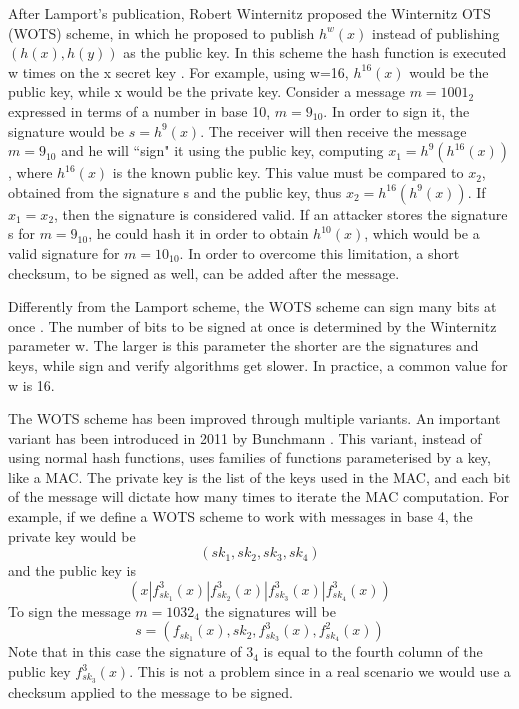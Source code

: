 \documentclass[a4paper,12pt]{article}
\begin{document}
After Lamport's publication, Robert Winternitz proposed the Winternitz OTS (WOTS) scheme, in which he proposed to publish $h^{w}(x)$ instead of publishing $(h(x),h(y))$ as the public key. In this scheme the hash function is executed w times on the x secret key \cite{53_hbs}.
For example, using w=16, $h^{16}(x)$ would be the public key, while x would be the private key. Consider a message $m=1001_{2}$ expressed in terms of a number in base 10, $m=9_{10}$. In order to sign it, the signature would be $s=h^{9}(x)$.
The receiver will then receive the message $m=9_{10}$ and he will ``sign" it using the public key, computing $x_{1}=h^{9}(h^{16}(x))$, where $h^{16}(x)$ is the known public key. This value must be compared to $x_{2}$, obtained from the signature s and the public key, thus $x_{2}=h^{16}(h^{9}(x))$. If $x_{1}=x_{2}$, then the signature is considered valid.
If an attacker stores the signature s for $m=9_{10}$, he could hash it in order to obtain $h^{10}(x)$, which would be a valid signature for $m=10_{10}$. In order to overcome this limitation, a short checksum, to be signed as well, can be added after the message.

Differently from the Lamport scheme, the WOTS scheme can sign many bits at once \cite{53_hbs}. The number of bits to be signed at once is determined by the Winternitz parameter w. The larger is this parameter the shorter are the signatures and keys, while sign and verify algorithms get slower. In practice, a common value for w is 16.

The WOTS scheme has been improved through multiple variants. An important variant has been introduced in 2011 by Bunchmann \cite{46_WOTSvariant}. This variant, instead of using normal hash functions, uses families of functions parameterised by a key, like a MAC.
The private key is the list of the keys used in the MAC, and each bit of the message will dictate how many times to iterate the MAC computation.
For example, if we define a WOTS scheme to work with messages in base 4, the private key would be $$(sk_{1}, sk_{2}, sk_{3}, sk_{4})$$ and the public key is $$(x|f^{3}_{sk_{1}}(x)|f^{3}_{sk_{2}}(x)|f^{3}_{sk_{3}}(x)|f^{3}_{sk_{4}}(x))$$
To sign the message $m=1032_{4}$ the signatures will be $$s=(f_{sk_{1}}(x) , sk_{2}, f^{3}_{sk_{3}}(x), f^{2}_{sk_{4}}(x))$$
Note that in this case the signature of $3_{4}$ is equal to the fourth column of the public key $f^{3}_{sk_{3}}(x)$. This is not a problem since in a real scenario we would use a checksum applied to the message to be signed.
\end{document}
